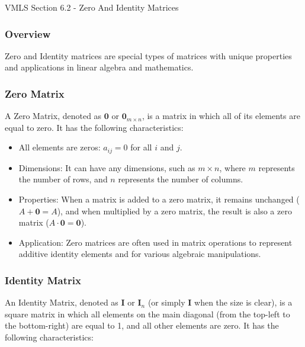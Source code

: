 \begin{notes}{VMLS Section 6.2 - Zero And Identity Matrices}
    \subsubsection*{Overview}

    Zero and Identity matrices are special types of matrices with unique properties and applications in linear algebra and mathematics.

    \subsubsection*{Zero Matrix}

    A Zero Matrix, denoted as $\mathbf{0}$ or $\mathbf{0}_{m \times n}$, is a matrix in which all of its elements are equal to zero. It has the following characteristics:

    \begin{itemize}
        \item All elements are zeros: $a_{ij} = 0$ for all $i$ and $j$.

        \item Dimensions: It can have any dimensions, such as $m \times n$, where $m$ represents the number of rows, and $n$ represents the number of columns.

        \item Properties: When a matrix is added to a zero matrix, it remains unchanged ($A + \mathbf{0} = A$), and when multiplied by a zero matrix, the result is also a zero matrix ($A \cdot \mathbf{0}
        = \mathbf{0}$).

        \item Application: Zero matrices are often used in matrix operations to represent additive identity elements and for various algebraic manipulations.
    \end{itemize}

    \subsubsection*{Identity Matrix}

    An Identity Matrix, denoted as $\mathbf{I}$ or $\mathbf{I}_n$ (or simply $\mathbf{I}$ when the size is clear), is a square matrix in which all elements on the main diagonal (from the top-left to 
    the bottom-right) are equal to 1, and all other elements are zero. It has the following characteristics:


\end{notes}
